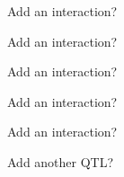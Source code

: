 \documentclass[aspectratio=169,12pt,t]{beamer}
\begin{document}
\begin{frame}[c]{Add an interaction?}


\end{frame}









\addtocounter{page}{-1}

\begin{frame}[c]{Add an interaction?}


\end{frame}









\addtocounter{page}{-1}

\begin{frame}[c]{Add an interaction?}


\end{frame}









\addtocounter{page}{-1}

\begin{frame}[c]{Add an interaction?}


\end{frame}









\addtocounter{page}{-1}

\begin{frame}[c]{Add an interaction?}


\end{frame}










\begin{frame}[c]{Add another QTL?}


\end{frame}
\end{document}

